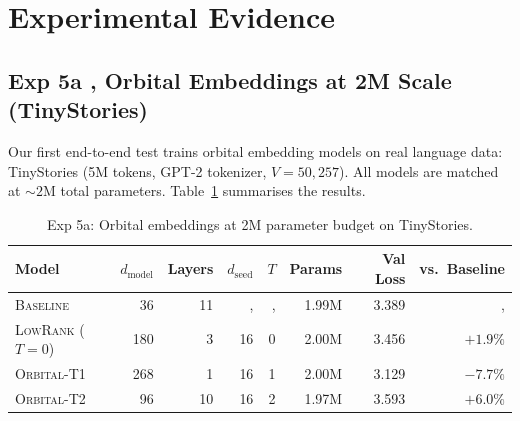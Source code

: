 \documentclass[11pt, a4paper]{article}
\theoremstyle{remark}
\begin{document}
\section{Experimental Evidence}\label{sec:experimental-evidence}

\subsection{Exp 5a ,  Orbital Embeddings at 2M Scale (TinyStories)}

Our first end-to-end test trains orbital embedding models on real language data: TinyStories (5M tokens, GPT-2 tokenizer, $V = 50{,}257$).
All models are matched at ${\sim}2\text{M}$ total parameters.
Table~\ref{tab:exp5a} summarises the results.

\begin{table}[h]
\centering
\caption{Exp 5a: Orbital embeddings at 2M parameter budget on TinyStories.}
\label{tab:exp5a}
\begin{tabular}{@{}lrrrrrrr@{}}
\toprule
Model & $d_{\text{model}}$ & Layers & $d_{\text{seed}}$ & $T$ & Params & Val Loss & vs.\ Baseline \\
\midrule
\textsc{Baseline}   & 36  & 11 & ,   & ,  & 1.99M & 3.389 & ,  \\
\textsc{LowRank} ($T\!=\!0$) & 180 & 3  & 16  & 0   & 2.00M & 3.456 & $+1.9\%$ \\
\textsc{Orbital-T1}  & 268 & 1  & 16  & 1   & 2.00M & 3.129 & $\mathbf{-7.7\%}$ \\
\textsc{Orbital-T2}  & 96  & 10 & 16  & 2   & 1.97M & 3.593 & $+6.0\%$ \\
\bottomrule
\end{tabular}
\end{table}
\end{document}
